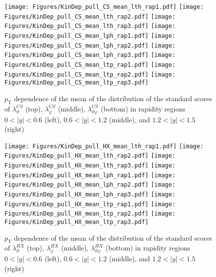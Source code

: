 \documentclass[12pt]{article}
\newcommand{\pT}{p_\mathrm{T}}
\newcommand{\absy}{\left |  y \right |}
\newcommand{\lamthCS}{\lambda^{\scriptscriptstyle CS}_\vartheta}
\newcommand{\lamphCS}{\lambda^{\scriptscriptstyle CS}_\varphi}
\newcommand{\lamthphCS}{\lambda^{\scriptscriptstyle CS}_{\vartheta \varphi}}
\newcommand{\lamthHX}{\lambda^{\scriptscriptstyle HX}_\vartheta}
\newcommand{\lamphHX}{\lambda^{\scriptscriptstyle HX}_\varphi}
\newcommand{\lamthphHX}{\lambda^{\scriptscriptstyle HX}_{\vartheta \varphi}}
\begin{document}


\begin{figure}[htbp]
\centering
\texttt{[image: Figures/KinDep\_pull\_CS\_mean\_lth\_rap1.pdf]}
\texttt{[image: Figures/KinDep\_pull\_CS\_mean\_lth\_rap2.pdf]}
\texttt{[image: Figures/KinDep\_pull\_CS\_mean\_lth\_rap3.pdf]}
\texttt{[image: Figures/KinDep\_pull\_CS\_mean\_lph\_rap1.pdf]}
\texttt{[image: Figures/KinDep\_pull\_CS\_mean\_lph\_rap2.pdf]}
\texttt{[image: Figures/KinDep\_pull\_CS\_mean\_lph\_rap3.pdf]}
\texttt{[image: Figures/KinDep\_pull\_CS\_mean\_ltp\_rap1.pdf]}
\texttt{[image: Figures/KinDep\_pull\_CS\_mean\_ltp\_rap2.pdf]}
\texttt{[image: Figures/KinDep\_pull\_CS\_mean\_ltp\_rap3.pdf]}
\caption{$\pT$ dependence of the mean of the distribution of the standard scores
of $\lamthCS$ (top), $\lamphCS$ (middle), $\lamthphCS$ (bottom) in rapidity
regions $0<\absy<0.6$ (left), $0.6<\absy<1.2$ (middle), and $1.2<\absy<1.5$ (right)}
\end{figure}
\clearpage

\begin{figure}[htbp]
\centering
\texttt{[image: Figures/KinDep\_pull\_HX\_mean\_lth\_rap1.pdf]}
\texttt{[image: Figures/KinDep\_pull\_HX\_mean\_lth\_rap2.pdf]}
\texttt{[image: Figures/KinDep\_pull\_HX\_mean\_lth\_rap3.pdf]}
\texttt{[image: Figures/KinDep\_pull\_HX\_mean\_lph\_rap1.pdf]}
\texttt{[image: Figures/KinDep\_pull\_HX\_mean\_lph\_rap2.pdf]}
\texttt{[image: Figures/KinDep\_pull\_HX\_mean\_lph\_rap3.pdf]}
\texttt{[image: Figures/KinDep\_pull\_HX\_mean\_ltp\_rap1.pdf]}
\texttt{[image: Figures/KinDep\_pull\_HX\_mean\_ltp\_rap2.pdf]}
\texttt{[image: Figures/KinDep\_pull\_HX\_mean\_ltp\_rap3.pdf]}
\caption{$\pT$ dependence of the mean of the distribution of the standard scores
of $\lamthHX$ (top), $\lamphHX$ (middle), $\lamthphHX$ (bottom) in rapidity
regions $0<\absy<0.6$ (left), $0.6<\absy<1.2$ (middle), and $1.2<\absy<1.5$ (right)}
\end{figure}
\clearpage
\end{document}
